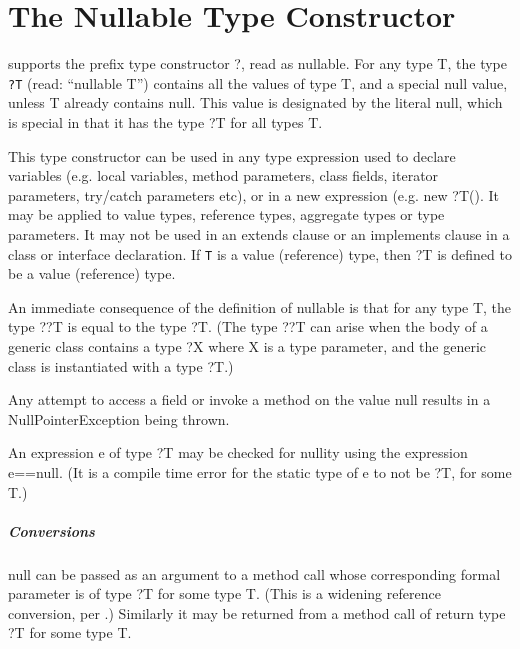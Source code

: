 \chapter{The Nullable Type Constructor}
\label{NullableTypeConstructor}

\Xten{} supports the prefix type constructor {\cf ?}, read as {\cf nullable}. 
For any type {\cf T}, the type {\tt ?T} (read: ``{\cf nullable T}'')
contains all the values of type {\cf T}, and a special {\cf null} value,
unless {\cf T} already contains {\cf null}. This value is designated by
the literal {\cf null}, which is special in that it has the type
{\cf ?T} for all types {\cf T}.

This type constructor can be used in any type expression used to
declare variables (e.g.{} local variable{s}, method parameter{s},
class field{s}, iterator parameter{s}, try/catch parameter{s} etc), or in
a new expression (e.g. {\cf new ?T()}. It may be applied to
value types, reference types, aggregate types or
type parameters. It may not be used in an {\cf extends} clause or an
{\cf implements} clause in a class or interface declaration. If
{\tt T}  is a value (reference) type, then {\cf ?T} is defined to be a
value (reference) type.

An immediate consequence of the definition of {\cf nullable} is that
for any type {\cf T}, the type {\cf ??T} is equal to the type {\cf
?T}. (The type {\cf ??T} can arise when the body of a generic class
contains a type {\cf ?X} where {\cf X} is a type parameter, and the
generic class is instantiated with a type {\cf ?T}.)

Any attempt to access a field or invoke a method on the value {\cf
null} results in a {\cf NullPointerException} being thrown.

An expression {\cf e} of type {\cf ?T} may be checked for nullity using the expression {\cf e==null}. (It is a compile time error for the static type of 
{\cf e} to not be {\cf ?T}, for some {\cf T}.)

\paragraph{Conversions}
{\cf null} can be passed as an argument to a method call whose
corresponding formal parameter is of type {\cf ?T} for some type
{\cf T}. (This is a widening reference conversion, per \cite[Sec
5.1.4]{jls2}.) Similarly it may be returned from a method call of
return type {\cf ?T} for some type {\cf T}.

